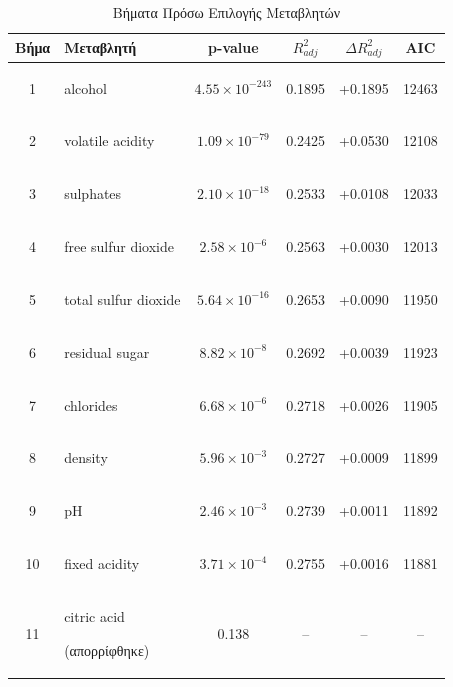 \documentclass[12pt,a4paper]{article}
\begin{document}
\begin{table}[H]
\centering
\caption{Βήματα Πρόσω Επιλογής Μεταβλητών}
\label{tab:forward}
\small
\begin{tabular}{clcccc}
\toprule
\textbf{Βήμα} & \textbf{Μεταβλητή} & \textbf{p-value} & $R^2_{adj}$ & $\Delta R^2_{adj}$ & \textbf{AIC} \\
\midrule
1 & \begin{english}alcohol\end{english} & $4.55 \times 10^{-243}$ & 0.1895 & +0.1895 & 12463 \\
2 & \begin{english}volatile acidity\end{english} & $1.09 \times 10^{-79}$ & 0.2425 & +0.0530 & 12108 \\
3 & \begin{english}sulphates\end{english} & $2.10 \times 10^{-18}$ & 0.2533 & +0.0108 & 12033 \\
4 & \begin{english}free sulfur dioxide\end{english} & $2.58 \times 10^{-6}$ & 0.2563 & +0.0030 & 12013 \\
5 & \begin{english}total sulfur dioxide\end{english} & $5.64 \times 10^{-16}$ & 0.2653 & +0.0090 & 11950 \\
6 & \begin{english}residual sugar\end{english} & $8.82 \times 10^{-8}$ & 0.2692 & +0.0039 & 11923 \\
7 & \begin{english}chlorides\end{english} & $6.68 \times 10^{-6}$ & 0.2718 & +0.0026 & 11905 \\
8 & \begin{english}density\end{english} & $5.96 \times 10^{-3}$ & 0.2727 & +0.0009 & 11899 \\
9 & \begin{english}pH\end{english} & $2.46 \times 10^{-3}$ & 0.2739 & +0.0011 & 11892 \\
10 & \begin{english}fixed acidity\end{english} & $3.71 \times 10^{-4}$ & 0.2755 & +0.0016 & 11881 \\
\midrule
11 & \begin{english}citric acid\end{english} (απορρίφθηκε) & 0.138 & -- & -- & -- \\
\bottomrule
\end{tabular}
\end{table}
\end{document}

